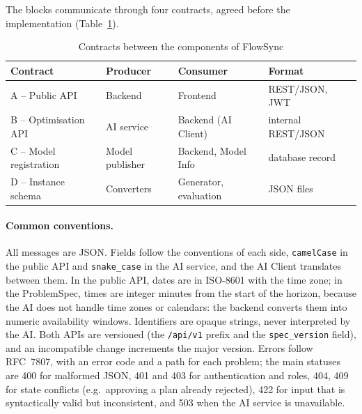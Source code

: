 The blocks communicate through four contracts, agreed before the implementation
(Table~\ref{tab:contracts}).

\begin{table}[htpb]
  \centering
  \small
  \begin{tabular}{@{}p{3.3cm}lll@{}}
    \toprule
    \textbf{Contract} & \textbf{Producer} & \textbf{Consumer} & \textbf{Format} \\
    \midrule
    A -- Public API          & Backend          & Frontend               & REST/JSON, JWT \\
    B -- Optimisation API    & AI service       & Backend (AI Client)    & internal REST/JSON \\
    C -- Model registration  & Model publisher  & Backend, Model Info    & database record \\
    D -- Instance schema     & Converters       & Generator, evaluation  & JSON files \\
    \bottomrule
  \end{tabular}
  \caption{Contracts between the components of FlowSync}
  \label{tab:contracts}
\end{table}

\paragraph{Common conventions.} All messages are JSON. Fields follow the conventions of each
side, \texttt{camelCase} in the public API and \texttt{snake\_case} in the AI service, and the AI
Client translates between them. In the public API, dates are in ISO-8601 with the time zone; in
the ProblemSpec, times are integer minutes from the start of the horizon, because the AI does not
handle time zones or calendars: the backend converts them into numeric availability windows.
Identifiers are opaque strings, never interpreted by the AI. Both APIs are versioned (the
\texttt{/api/v1} prefix and the \texttt{spec\_version} field), and an incompatible change
increments the major version. Errors follow RFC~7807, with an error code and a path for each
problem; the main statuses are 400 for malformed JSON, 401 and 403 for authentication and roles,
404, 409 for state conflicts (e.g.\ approving a plan already rejected), 422 for input that is
syntactically valid but inconsistent, and 503 when the AI service is unavailable.


